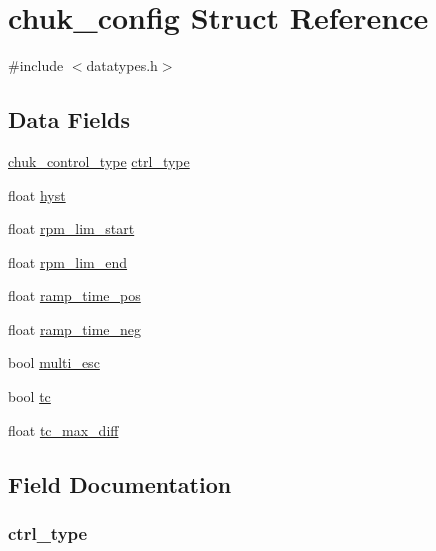 \hypertarget{structchuk__config}{}\section{chuk\+\_\+config Struct Reference}
\label{structchuk__config}


{\ttfamily \#include $<$datatypes.\+h$>$}

\subsection*{Data Fields}
\begin{DoxyCompactItemize}
\item 
\hyperlink{datatypes_8h_adeb53b1ad282fb36244ee735b1dd8d7d}{chuk\+\_\+control\+\_\+type} \hyperlink{structchuk__config_ac1d307a95ac9b31f6a0ec8293e3544af}{ctrl\+\_\+type}
\item 
float \hyperlink{structchuk__config_a67e26f0a581dc7931b59e06f3a9d29e7}{hyst}
\item 
float \hyperlink{structchuk__config_a009df1769dd668beb51124d481f57917}{rpm\+\_\+lim\+\_\+start}
\item 
float \hyperlink{structchuk__config_a52298130b8eeda979a0ebe2f8683cf7f}{rpm\+\_\+lim\+\_\+end}
\item 
float \hyperlink{structchuk__config_a034d5bee148a1c658826178f3ff0ef6e}{ramp\+\_\+time\+\_\+pos}
\item 
float \hyperlink{structchuk__config_a98001969910108af166d52641951d0b8}{ramp\+\_\+time\+\_\+neg}
\item 
bool \hyperlink{structchuk__config_a0adcb4125f8defe13178bad39f30b5f9}{multi\+\_\+esc}
\item 
bool \hyperlink{structchuk__config_adb12b652190d775d7d98e95fcde39856}{tc}
\item 
float \hyperlink{structchuk__config_a08878e275186fe365e2e23cc038fed07}{tc\+\_\+max\+\_\+diff}
\end{DoxyCompactItemize}


\subsection{Field Documentation}
\hypertarget{structchuk__config_ac1d307a95ac9b31f6a0ec8293e3544af}{}
\subsubsection[{ctrl\+\_\+type}]{ ctrl\+\_\+type}\label{structchuk__config_ac1d307a95ac9b31f6a0ec8293e3544af}
\hypertarget{structchuk__config_a67e26f0a581dc7931b59e06f3a9d29e7}{}
